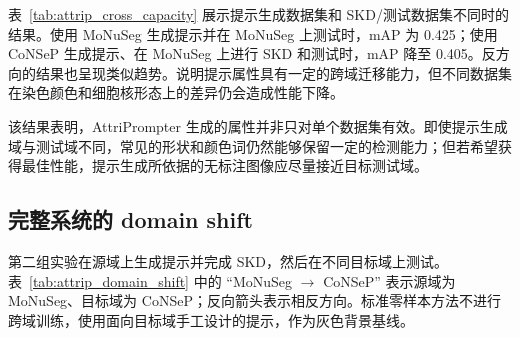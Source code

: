 表~\ref{tab:attrip_cross_capacity} 展示提示生成数据集和 SKD/测试数据集不同时的结果。使用 MoNuSeg 生成提示并在 MoNuSeg 上测试时，mAP 为 0.425；使用 CoNSeP 生成提示、在 MoNuSeg 上进行 SKD 和测试时，mAP 降至 0.405。反方向的结果也呈现类似趋势。说明提示属性具有一定的跨域迁移能力，但不同数据集在染色颜色和细胞核形态上的差异仍会造成性能下降。

\begin{table}[t]
\caption{AttriPrompter 跨域检测结果}
\label{tab:attrip_cross_capacity}
\begin{center}
\end{center}
\vskip -0.15in
\end{table}

该结果表明，AttriPrompter 生成的属性并非只对单个数据集有效。即使提示生成域与测试域不同，常见的形状和颜色词仍然能够保留一定的检测能力；但若希望获得最佳性能，提示生成所依据的无标注图像应尽量接近目标测试域。

\subsection{完整系统的 domain shift}

第二组实验在源域上生成提示并完成 SKD，然后在不同目标域上测试。表~\ref{tab:attrip_domain_shift} 中的 ``MoNuSeg $\rightarrow$ CoNSeP'' 表示源域为 MoNuSeg、目标域为 CoNSeP；反向箭头表示相反方向。标准零样本方法不进行跨域训练，使用面向目标域手工设计的提示，作为灰色背景基线。

